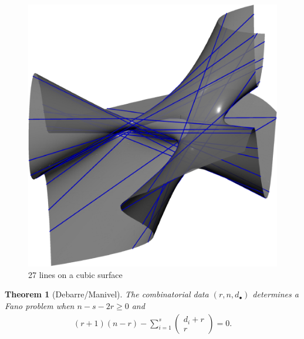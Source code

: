 \documentclass[final]{beamer}
\theoremstyle{thrm}
\newtheorem{thm}{Theorem}
\begin{document}
\begin{frame}
\begin{minipage}[t]{.3\textwidth}
\begin{center}
\begin{figure}[27lines]
\includegraphics[scale=.55]{figures/27lines.pdf}
\caption{27 lines on a cubic surface}
\end{figure}
\end{center}


\begin{thm}[Debarre/Manivel]
\vspace{.2cm}
The combinatorial data $(r,n,d_\bullet)$ determines a Fano problem when $n-s-2r\ge 0$ and
\begin{align*}
(r+1)(n-r) - \sum_{i=1}^s \begin{pmatrix}d_i + r\\r\end{pmatrix}=0.
\end{align*}
\vspace{.1cm}
\end{thm}


\end{minipage}
\end{frame}
\end{document}
